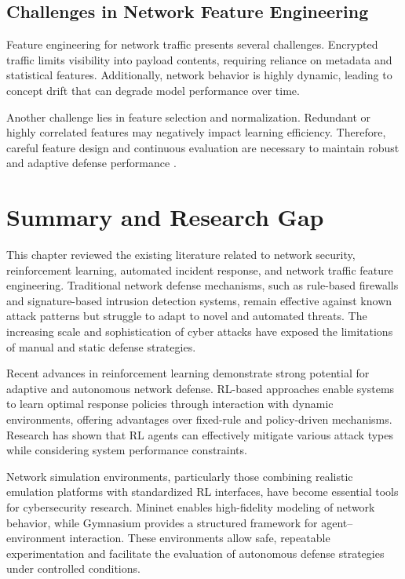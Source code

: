 \documentclass[12pt,a4paper]{report}
\begin{document}
\subsection{Challenges in Network Feature Engineering}

Feature engineering for network traffic presents several challenges.
Encrypted traffic limits visibility into payload contents, requiring reliance on metadata and statistical features.
Additionally, network behavior is highly dynamic, leading to concept drift that can degrade model performance over time.

Another challenge lies in feature selection and normalization.
Redundant or highly correlated features may negatively impact learning efficiency.
Therefore, careful feature design and continuous evaluation are necessary to maintain robust and adaptive defense performance \cite{scapy2007,flowFeatureSurvey2020}.

\section{Summary and Research Gap}

This chapter reviewed the existing literature related to network security, reinforcement learning, automated incident response, and network traffic feature engineering.
Traditional network defense mechanisms, such as rule-based firewalls and signature-based intrusion detection systems, remain effective against known attack patterns but struggle to adapt to novel and automated threats.
The increasing scale and sophistication of cyber attacks have exposed the limitations of manual and static defense strategies.

Recent advances in reinforcement learning demonstrate strong potential for adaptive and autonomous network defense.
RL-based approaches enable systems to learn optimal response policies through interaction with dynamic environments, offering advantages over fixed-rule and policy-driven mechanisms.
Research has shown that RL agents can effectively mitigate various attack types while considering system performance constraints.

Network simulation environments, particularly those combining realistic emulation platforms with standardized RL interfaces, have become essential tools for cybersecurity research.
Mininet enables high-fidelity modeling of network behavior, while Gymnasium provides a structured framework for agent–environment interaction.
These environments allow safe, repeatable experimentation and facilitate the evaluation of autonomous defense strategies under controlled conditions.
\end{document}
